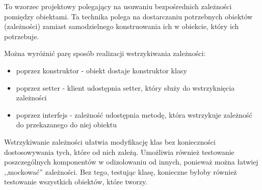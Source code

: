 \begin{definition}
To wzorzec projektowy polegający na usuwaniu bezpośrednich zależności pomiędzy obiektami. Ta technika polega na dostarczaniu potrzebnych obiektów (zależności) zamiast samodzielnego konstruowania ich w obiekcie, który ich potrzebuje.
\end{definition}
Można wyróżnić parę sposób realizacji wstrzykiwania zależności:
\begin{itemize}
    \singlespacing
    \item poprzez konstruktor - obiekt dostaje konstruktor klasy
    \item poprzez setter - klient udostępnia setter, który służy do wstrzyknięcia zależności
    \item poprzez interfejs - zależność udostępnia metodę, która wstrzykuje zależność do przekazanego do niej obiektu
\end{itemize}
Wstrzykiwanie zależności ułatwia modyfikację klas bez konieczności dostosowywania tych, które od nich zależą. Umożliwia również testowanie poszczególnych komponentów w odizolowaniu od innych, ponieważ można łatwiej ,,mockować'' zależności. Bez tego, testując klasę, konieczne byłoby również testowanie wszystkich obiektów, które tworzy.